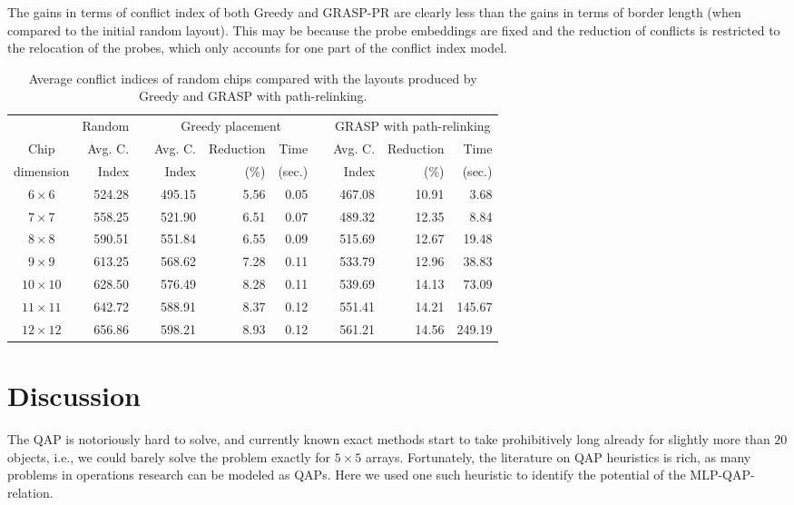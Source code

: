 The gains in terms of conflict index of both Greedy and GRASP-PR are clearly
less than the gains in terms of border length (when compared to the initial
random layout). This may be because the probe embeddings are fixed and the
reduction of conflicts is restricted to the relocation of the probes, which only
accounts for one part of the conflict index model.

\begin{table}[t]
\caption{\label{tab:graspr_greedy_ci}
  Average conflict indices of random chips compared with the layouts produced by
  Greedy and GRASP with path-relinking.}
\small{
\begin{tabular*}{\hsize}{crcrrrcrrr}
          & Random & & \multicolumn{3}{c}{Greedy placement}  & & \multicolumn{3}{c}{GRASP with path-relinking}  \\ \cline{2-2} \cline{4-6} \cline{8-10}
Chip      & Avg. C.& & Avg. C.& Reduction & Time             & & Avg. C.& Reduction & Time   \\
dimension & Index  & & Index  & (\%)      & (sec.)           & & Index  & (\%)      & (sec.) \\
\hline
$6\times 6$   & 524.28 & & 495.15 & 5.56 & 0.05 & & 467.08 & 10.91 &   3.68 \\
$7\times 7$   & 558.25 & & 521.90 & 6.51 & 0.07 & & 489.32 & 12.35 &   8.84 \\
$8\times 8$   & 590.51 & & 551.84 & 6.55 & 0.09 & & 515.69 & 12.67 &  19.48 \\
$9\times 9$   & 613.25 & & 568.62 & 7.28 & 0.11 & & 533.79 & 12.96 &  38.83 \\
$10\times 10$ & 628.50 & & 576.49 & 8.28 & 0.11 & & 539.69 & 14.13 &  73.09 \\
$11\times 11$ & 642.72 & & 588.91 & 8.37 & 0.12 & & 551.41 & 14.21 & 145.67 \\
$12\times 12$ & 656.86 & & 598.21 & 8.93 & 0.12 & & 561.21 & 14.56 & 249.19 \\
\hline
\end{tabular*}}
\end{table}

\section{Discussion}
\label{sec:qap_discussion}

The QAP is notoriously hard to solve, and currently known exact methods start to
take prohibitively long already for slightly more than $20$ objects, i.e., we
could barely solve the problem exactly for $5\times 5$ arrays. Fortunately, the
literature on QAP heuristics is rich, as many problems in operations research
can be modeled as QAPs. Here we used one such heuristic to identify the
potential of the MLP-QAP-relation.

